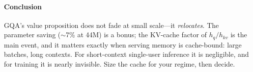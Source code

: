\paragraph{Conclusion}

GQA's value proposition does not fade at small scale---it
\emph{relocates}. The parameter saving ($\sim$7\% at 44M) is a
bonus; the KV-cache factor of $h_q/h_{kv}$ is the main event, and
it matters exactly when serving memory is cache-bound: large
batches, long contexts. For short-context single-user inference it
is negligible, and for training it is nearly invisible. Size the
cache for your regime, then decide.
